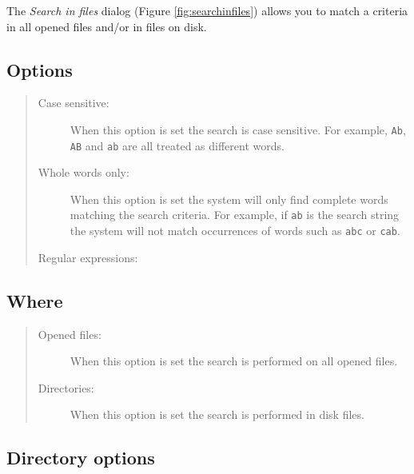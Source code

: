 The \textit{Search in files} dialog
(Figure \ref{fig:searchinfiles})
allows you to match a criteria in all opened files and/or in files on disk.


\subsection{Options}

\begin{quote}
  \begin{footnotesize}
    \begin{description}
      \item[Case sensitive:]
        When this option is set the search is case sensitive.
        For example, \texttt{Ab}, \texttt{AB} and \texttt{ab}
        are all treated as different words.
      \item[Whole words only:]
        When this option is set the system will only find complete
        words matching the search criteria. For example, if
        \texttt{ab} is the search string the system will not match
        occurrences of words such as \texttt{abc} or \texttt{cab}.
      \item[Regular expressions:]
    \end{description}
  \end{footnotesize}
\end{quote}


\subsection{Where}

\begin{quote}
  \begin{footnotesize}
    \begin{description}
      \item[Opened files:]
        When this option is set the search is performed on all opened files.
      \item[Directories:]
        When this option is set the search is performed in disk files.
    \end{description}
  \end{footnotesize}
\end{quote}


\subsection{Directory options}

